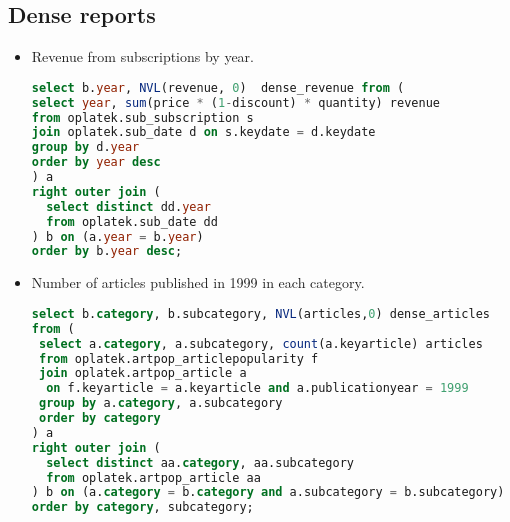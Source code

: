 \subsection{Dense reports} %
\label{sub:Dense reports}
\begin{itemize}
\item Revenue from subscriptions by year.
\begin{lstlisting}[language=sql] 
select b.year, NVL(revenue, 0)  dense_revenue from (
select year, sum(price * (1-discount) * quantity) revenue 
from oplatek.sub_subscription s 
join oplatek.sub_date d on s.keydate = d.keydate 
group by d.year 
order by year desc
) a
right outer join (
  select distinct dd.year
  from oplatek.sub_date dd
) b on (a.year = b.year)
order by b.year desc;
\end{lstlisting}

\item Number of articles published in 1999 in each category.
\begin{lstlisting}[language=sql] 
select b.category, b.subcategory, NVL(articles,0) dense_articles 
from (
 select a.category, a.subcategory, count(a.keyarticle) articles
 from oplatek.artpop_articlepopularity f
 join oplatek.artpop_article a 
  on f.keyarticle = a.keyarticle and a.publicationyear = 1999
 group by a.category, a.subcategory
 order by category
) a
right outer join (
  select distinct aa.category, aa.subcategory
  from oplatek.artpop_article aa
) b on (a.category = b.category and a.subcategory = b.subcategory)
order by category, subcategory;
\end{lstlisting}
\end{itemize}

